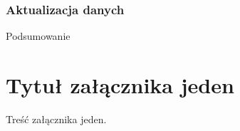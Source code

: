 \documentclass[brudnopis]{xmgr}
\begin{document}
\subsection{Aktualizacja danych}

\summary
Podsumowanie

\appendix
\chapter{Tytuł załącznika jeden}

Treść załącznika jeden.




\listoftables

\listoffigures

\oswiadczenie
\end{document}
